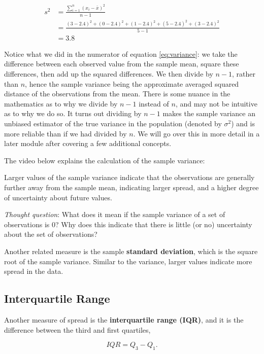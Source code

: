 \documentclass[
]{book}
\begin{document}
\[
\begin{split}
s^2 &= \frac{\sum_{i=1}^n (x_i-\bar{x})^2}{n-1}\\
 &= \frac{(3-2.4)^2 + (0-2.4)^2 + (1-2.4)^2 + (5-2.4)^2 + (3-2.4)^2}{5-1} \\
&= 3.8 
\end{split}
\]

Notice what we did in the numerator of equation \eqref{eq:variance}: we take the difference between each observed value from the sample mean, square these differences, then add up the squared differences. We then divide by \(n-1\), rather than \(n\), hence the sample variance being the approximate averaged squared distance of the observations from the mean. There is some nuance in the mathematics as to why we divide by \(n-1\) instead of \(n\), and may not be intuitive as to why we do so. It turns out dividing by \(n-1\) makes the sample variance an unbiased estimator of the true variance in the population (denoted by \(\sigma^2\)) and is more reliable than if we had divided by \(n\). We will go over this in more detail in a later module after covering a few additional concepts.

The video below explains the calculation of the sample variance:

Larger values of the sample variance indicate that the observations are generally further away from the sample mean, indicating larger spread, and a higher degree of uncertainty about future values.

\emph{Thought question}: What does it mean if the sample variance of a set of observations is 0? Why does this indicate that there is little (or no) uncertainty about the set of observations?

Another related measure is the sample \textbf{standard deviation}, which is the square root of the sample variance. Similar to the variance, larger values indicate more spread in the data.

\hypertarget{interquartile-range}{%
\subsection{Interquartile Range}\label{interquartile-range}}

Another measure of spread is the \textbf{interquartile range (IQR)}, and it is the difference between the third and first quartiles,

\begin{equation} 
IQR = Q_3 - Q_1.
\label{eq:IQR}
\end{equation}
\end{document}

